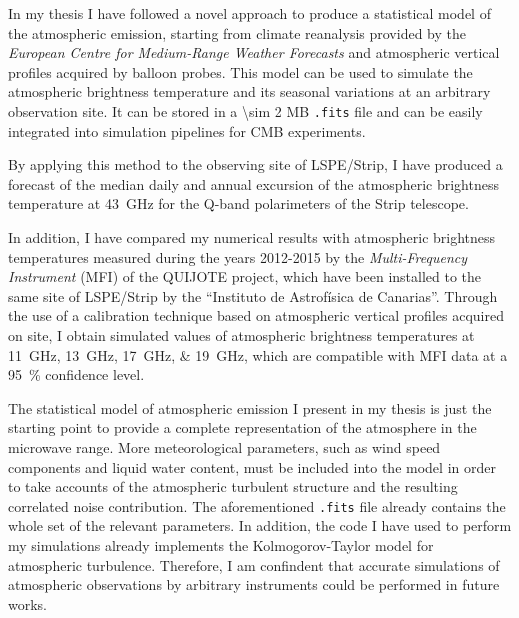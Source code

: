 \documentclass[11pt,letterpaper]{article}
\begin{document}
In my thesis I have followed a novel approach to produce a statistical
model of the atmospheric emission, starting from climate reanalysis
provided by the \emph{European Centre for Medium-Range Weather Forecasts}
and atmospheric vertical profiles acquired by balloon probes. This model
can be used to simulate the atmospheric brightness temperature and its
seasonal variations at an arbitrary observation site. It can be stored in a
\num{\sim 2} MB \texttt{.fits} file and can be easily integrated into
simulation pipelines for CMB experiments.

By applying this method to the observing site of LSPE/Strip, I have
produced a forecast of the median daily and annual excursion of the
atmospheric brightness temperature at \SI{43}{\giga\hertz} for the Q-band
polarimeters of the Strip telescope.

In addition, I have compared my numerical results with atmospheric
brightness temperatures measured during the years 2012-2015 by the
\emph{Multi-Frequency Instrument} (MFI) of the QUIJOTE project, which have
been installed to the same site of LSPE/Strip by the ``Instituto de
Astrof\'isica de Canarias''. Through the use of a calibration technique
based on atmospheric vertical profiles acquired on site, I obtain simulated
values of atmospheric brightness temperatures at
\SIlist{11;13;17;19}{\giga\hertz}, which are compatible with MFI data at a
\SI{95}{\percent} confidence level.

The statistical model of atmospheric emission I present in my thesis is
just the starting point to provide a complete representation of the
atmosphere in the microwave range. More meteorological parameters, such as
wind speed components and liquid water content, must be included into the
model in order to take accounts of the atmospheric turbulent structure and
the resulting correlated noise contribution. The aforementioned
\texttt{.fits} file already contains the whole set of the relevant
parameters. In addition, the code I have used to perform my simulations
already implements the Kolmogorov-Taylor model for atmospheric turbulence.
Therefore, I am confindent that accurate simulations of atmospheric
observations by arbitrary instruments could be performed in future works.
\end{document}
